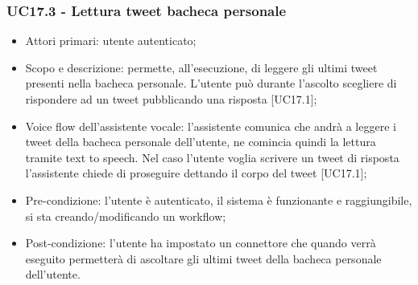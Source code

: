 \subsubsection{UC17.3 - Lettura tweet bacheca personale}
\begin{itemize}
	\item  Attori primari: utente autenticato;
	\item  Scopo e descrizione: permette, all'esecuzione, di leggere gli ultimi tweet presenti nella bacheca personale. L'utente può durante l'ascolto scegliere di rispondere ad un tweet pubblicando una risposta [UC17.1];
	\item  Voice flow dell'assistente vocale: l'assistente comunica che andrà a leggere i tweet della bacheca personale dell'utente, ne comincia quindi la lettura tramite text to speech. Nel caso l'utente voglia scrivere un tweet di risposta l'assistente chiede di proseguire dettando il corpo del tweet [UC17.1];
	\item  Pre-condizione: l'utente è autenticato, il sistema è funzionante e raggiungibile, si sta creando/modificando un workflow;
	\item  Post-condizione: l'utente ha impostato un connettore che quando verrà eseguito permetterà di ascoltare gli ultimi tweet della bacheca personale dell'utente.
\end{itemize}

